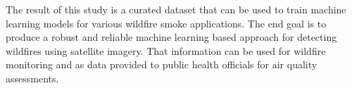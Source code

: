 \documentclass{ametsocV6.1}
\begin{document}
The result of this study is a curated dataset that can be used to train machine learning models for various wildfire smoke applications. The end goal is to produce a robust and reliable machine learning based approach for detecting wildfires using satellite imagery. That information can be used for wildfire monitoring and as data provided to public health officials for air quality assessments.



\clearpage

\acknowledgments

\datastatement







\end{document}
